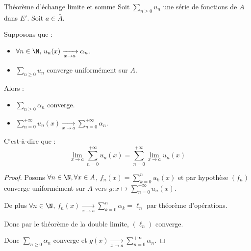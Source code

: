 \begin{theoreme}{Théorème d'échange limite et somme}{}
    Soit $\sum_{n \geqslant 0 } u_n$ une série de fonctions de $A$ dans $E'$. Soit $a \in \bar A$. 

    Supposons que :
    \begin{itemize}
        \item $\forall n \in \N, \, u_n(x) \xrightarrow[x \to a]{} \alpha_n$.
        \item $\sum_{n \geqslant 0} u_n$ converge uniformément sur $A$.
    \end{itemize}
    Alors : 
    \begin{itemize}
        \item $\displaystyle \sum_{n \geqslant 0} \alpha_n$ converge.
        \item $ \displaystyle \sum_{n = 0 }^{+\infty} u_n(x) \xrightarrow[x \to a]{} \sum_{n = 0}^{+ \infty} \alpha_n$.
    \end{itemize} 

    C'est-à-dire que :
    \[\lim_{x \to a} \sum_{n = 0}^{+ \infty} u_n(x) = \sum_{n = 0}^{+ \infty} \lim_{x \to a} u_n(x)\]
\end{theoreme}


\begin{proof}
    Posons $\forall n \in \N, \forall x \in A$, $\displaystyle f_n(x) = \sum_{k = 0}^n u_k(x)$ et par hypothèse 
    $(f_n)$ converge uniformément sur $A$ vers $\displaystyle g : x \mapsto \sum_{n = 0}^{+ \infty} u_n(x)$.

    De plus $\displaystyle \forall n \in \N$, $\displaystyle f_n(x) \xrightarrow[x \to a]{} \sum_{k = 0}^n \alpha_k = \ell_n$ par théorème d'opérations. 

    Donc par le théorème de la double limite, $(\ell_n)$ converge.

    Donc $\displaystyle \sum_{n \geqslant 0} \alpha_n$ converge et 
    $\displaystyle g(x) \xrightarrow[x \to a]{} \sum_{n = 0}^{+ \infty} \alpha_n$.
\end{proof}

